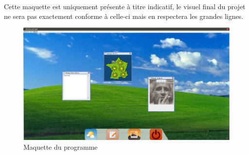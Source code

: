 Cette maquette est uniquement présente à titre indicatif, le visuel final du projet ne sera pas exactement conforme à celle-ci mais en respectera les grandes lignes.

\begin{figure}[H]
	\centering
	\includegraphics[scale=0.2]{images/maquetteFinale.png}
	\caption{Maquette du programme}
\end{figure}